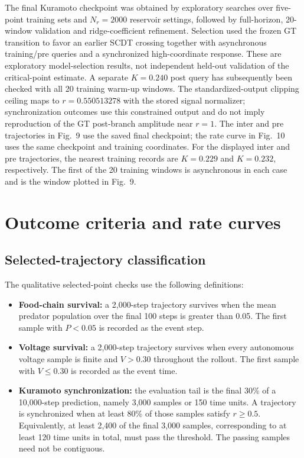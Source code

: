 \documentclass[10pt,a4paper]{article}
\begin{document}
The final Kuramoto checkpoint was obtained by exploratory searches over
five-point training sets and $N_r=2000$ reservoir settings, followed by
full-horizon, 20-window validation and ridge-coefficient refinement. Selection
used the frozen GT transition to favor an earlier SCDT crossing together with
asynchronous training/pre queries and a synchronized high-coordinate response.
These are exploratory model-selection results, not independent held-out
validation of the critical-point estimate. A separate $K=0.240$ post query
has subsequently been checked with all 20 training warm-up windows.
The standardized-output clipping ceiling maps to $r=0.550513278$ with the
stored signal normalizer; synchronization outcomes use this constrained output
and do not imply reproduction of the GT post-branch amplitude near $r=1$.
The inter and pre trajectories in Fig.~9 use the saved final checkpoint; the
rate curve in Fig.~10 uses the same checkpoint and training coordinates.
For the displayed inter and pre trajectories, the nearest training records
are $K=0.229$ and $K=0.232$, respectively. The first of the 20 training
windows is asynchronous in each case and is the window plotted in Fig.~9.

\section{Outcome criteria and rate curves}

\subsection{Selected-trajectory classification}

The qualitative selected-point checks use the following definitions:
\begin{itemize}
  \item \textbf{Food-chain survival:} a 2,000-step trajectory survives when
  the mean predator population over the final 100 steps is greater than 0.05.
  The first sample with $P<0.05$ is recorded as the event step.
  \item \textbf{Voltage survival:} a 2,000-step trajectory survives when every
  autonomous voltage sample is finite and $V>0.30$ throughout the rollout. The
  first sample with $V\le0.30$ is recorded as the event time.
  \item \textbf{Kuramoto synchronization:} the evaluation tail is the final
  30\% of a 10,000-step prediction, namely 3,000 samples or 150 time units. A
  trajectory is synchronized when at least 80\% of those samples satisfy
  $r\ge0.5$. Equivalently, at least 2,400 of the final 3,000 samples, corresponding
  to at least 120 time units in total, must pass the threshold. The passing
  samples need not be contiguous.
\end{itemize}
\end{document}
